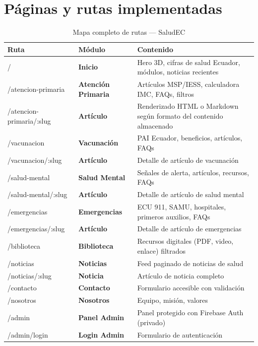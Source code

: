 \documentclass[12pt, a4paper]{article}
\begin{document}
\section{Páginas y rutas implementadas}

\begin{table}[H]
\centering
\caption{Mapa completo de rutas --- SaludEC}
\begin{tabular}{@{}>{\ttfamily\small}p{4.5cm} >{\bfseries}p{3cm} p{5.5cm}@{}}
\toprule
\rowcolor{royalblue!12}
\textbf{Ruta} & \textbf{Módulo} & \textbf{Contenido} \\
\midrule
/ & Inicio & Hero 3D, cifras de salud Ecuador, módulos, noticias recientes \\
/atencion-primaria & Atención Primaria & Artículos MSP/IESS, calculadora IMC, FAQs, filtros \\
/atencion-primaria/:slug & Artículo & Renderizado HTML o Markdown según formato del contenido almacenado \\
/vacunacion & Vacunación & PAI Ecuador, beneficios, artículos, FAQs \\
/vacunacion/:slug & Artículo & Detalle de artículo de vacunación \\
/salud-mental & Salud Mental & Señales de alerta, artículos, recursos, FAQs \\
/salud-mental/:slug & Artículo & Detalle de artículo de salud mental \\
/emergencias & Emergencias & ECU 911, SAMU, hospitales, primeros auxilios, FAQs \\
/emergencias/:slug & Artículo & Detalle de artículo de emergencias \\
/biblioteca & Biblioteca & Recursos digitales (PDF, video, enlace) filtrados \\
/noticias & Noticias & Feed paginado de noticias de salud \\
/noticias/:slug & Noticia & Artículo de noticia completo \\
/contacto & Contacto & Formulario accesible con validación \\
/nosotros & Nosotros & Equipo, misión, valores \\
/admin & Panel Admin & Panel protegido con Firebase Auth (privado) \\
/admin/login & Login Admin & Formulario de autenticación \\
\bottomrule
\end{tabular}
\end{table}
\end{document}
